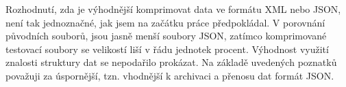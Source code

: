 Rozhodnutí, zda je výhodnější komprimovat data ve formátu XML nebo JSON, není tak jednoznačné, jak jsem na začátku práce předpokládal. V porovnání původních souborů, jsou jasně menší soubory JSON, zatímco komprimované testovací soubory se velikostí liší v řádu jednotek procent. Výhodnost využití znalosti struktury dat se nepodařilo prokázat. Na základě uvedených poznatků považuji za úspornější, tzn. vhodnější k archivaci a přenosu dat formát JSON.